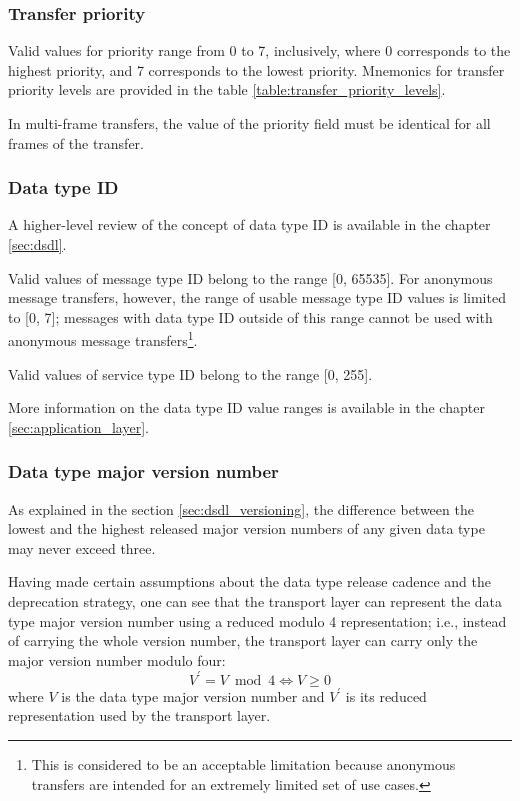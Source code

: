 \subsubsection{Transfer priority}

Valid values for priority range from 0 to 7, inclusively,
where 0 corresponds to the highest priority, and 7 corresponds to the lowest priority.
Mnemonics for transfer priority levels are provided in the table \ref{table:transfer_priority_levels}.

In multi-frame transfers, the value of the priority field must be identical for all frames of the transfer.

\subsubsection{Data type ID}

A higher-level review of the concept of data type ID is available in the chapter \ref{sec:dsdl}.

Valid values of message type ID belong to the range [0, 65535].
For anonymous message transfers, however, the range of usable message type ID values
is limited to [0, 7];
messages with data type ID outside of this range cannot be used with anonymous message
transfers\footnote{This is considered to be an acceptable limitation because anonymous transfers
are intended for an extremely limited set of use cases.}.

Valid values of service type ID belong to the range [0, 255].

More information on the data type ID value ranges is available in the chapter \ref{sec:application_layer}.

\subsubsection{Data type major version number}

As explained in the section \ref{sec:dsdl_versioning},
the difference between the lowest and the highest released major version numbers of any given data type
may never exceed three.

Having made certain assumptions about the data type release cadence and the deprecation strategy,
one can see that the transport layer can represent the data type major version number using a reduced
modulo 4 representation; i.e., instead of carrying the whole version number, the transport layer
can carry only the major version number modulo four:
$$V^\prime{} = V \bmod 4 \Leftrightarrow{} V \geq{} 0$$
where $V$ is the data type major version number and $V^\prime{}$ is its reduced representation used by
the transport layer.

